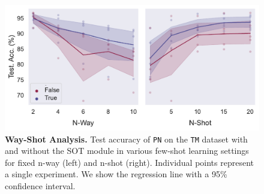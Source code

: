 \begin{figure}[h!]
    \centering
    \includegraphics[width=1\columnwidth]{figures/way-shot.pdf}
    \caption{\textbf{Way-Shot Analysis.} Test accuracy of \texttt{PN} on the \texttt{TM} dataset with and without the SOT module in various 
    few-shot learning settings for fixed n-way (left) and n-shot (right). Individual points represent a single experiment. We show the regression line with a 
    95\% confidence interval.}
    \label{fig:way-shot}
\end{figure}
